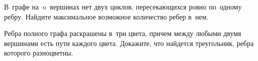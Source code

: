 \begin{problems}
\item
В~графе на~$n$~вершинах нет двух циклов, пересекающихся ровно по~одному ребру.
Найдите максимальное возможное количество ребер в~нем.

\itemx{*}
Ребра полного графа раскрашены в~три цвета, причем между любыми двумя вершинами
есть пути каждого цвета.
Докажите, что найдется треугольник, ребра которого разноцветны.

\end{problems}

